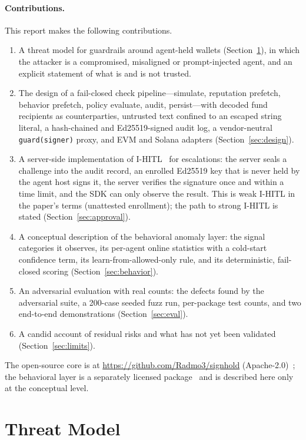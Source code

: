 \documentclass[10pt]{article}
\newcommand{\code}[1]{{\def\_{\char`\_\allowbreak}\texttt{#1}}}
\begin{document}
\paragraph{Contributions.} This report makes the following contributions.
\begin{enumerate}
  \item A threat model for guardrails around agent-held wallets (Section~\ref{sec:threat}), in which the attacker is a compromised, misaligned or prompt-injected agent, and an explicit statement of what is and is not trusted.
  \item The design of a fail-closed check pipeline---simulate, reputation prefetch, behavior prefetch, policy evaluate, audit, persist---with decoded fund recipients as counterparties, untrusted text confined to an escaped string literal, a hash-chained and Ed25519-signed audit log, a vendor-neutral \code{guard(signer)} proxy, and EVM and Solana adapters (Section~\ref{sec:design}).
  \item A server-side implementation of I-HITL~\cite{ihitl} for escalations: the server seals a challenge into the audit record, an enrolled Ed25519 key that is never held by the agent host signs it, the server verifies the signature once and within a time limit, and the SDK can only observe the result. This is weak I-HITL in the paper's terms (unattested enrollment); the path to strong I-HITL is stated (Section~\ref{sec:approval}).
  \item A conceptual description of the behavioral anomaly layer: the signal categories it observes, its per-agent online statistics with a cold-start confidence term, its learn-from-allowed-only rule, and its deterministic, fail-closed scoring (Section~\ref{sec:behavior}).
  \item An adversarial evaluation with real counts: the defects found by the adversarial suite, a 200-case seeded fuzz run, per-package test counts, and two end-to-end demonstrations (Section~\ref{sec:eval}).
  \item A candid account of residual risks and what has not yet been validated (Section~\ref{sec:limits}).
\end{enumerate}

The open-source core is at \url{https://github.com/Radmo3/signhold} (Apache-2.0)~\cite{repo}; the behavioral layer is a separately licensed package~\cite{behrepo} and is described here only at the conceptual level.

\section{Threat Model}
\label{sec:threat}
\end{document}
